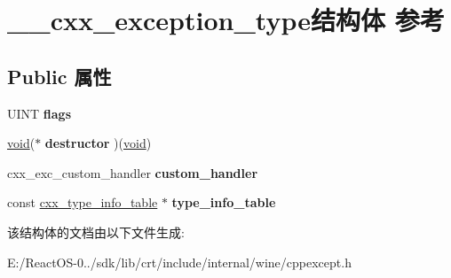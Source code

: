 \hypertarget{struct____cxx__exception__type}{}\section{\+\_\+\+\_\+cxx\+\_\+exception\+\_\+type结构体 参考}
\label{struct____cxx__exception__type}
\subsection*{Public 属性}
\begin{DoxyCompactItemize}
\item 
\mbox{\label{struct____cxx__exception__type_aeae0ac8b3348166706e899bccbd8107b}} 
U\+I\+NT {\bfseries flags}
\item 
\mbox{\label{struct____cxx__exception__type_ad843a69e76b7017546079ff53ecbe63d}} 
\hyperlink{interfacevoid}{void}($\ast$ {\bfseries destructor} )(\hyperlink{interfacevoid}{void})
\item 
\mbox{\label{struct____cxx__exception__type_a0b913a35fce77b1b76b60a55f61fefde}} 
cxx\+\_\+exc\+\_\+custom\+\_\+handler {\bfseries custom\+\_\+handler}
\item 
\mbox{\label{struct____cxx__exception__type_aeb10799dae13a0a94f42ced07a8c3006}} 
const \hyperlink{struct____cxx__type__info__table}{cxx\+\_\+type\+\_\+info\+\_\+table} $\ast$ {\bfseries type\+\_\+info\+\_\+table}
\end{DoxyCompactItemize}


该结构体的文档由以下文件生成\+:\begin{DoxyCompactItemize}
\item 
E\+:/\+React\+O\+S-\/0../sdk/lib/crt/include/internal/wine/cppexcept.\+h\end{DoxyCompactItemize}
